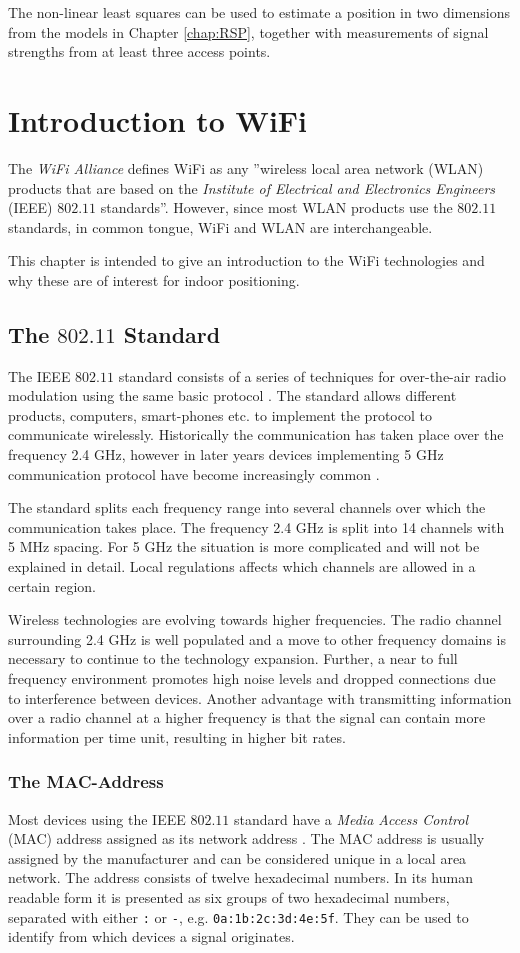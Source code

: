 \documentclass{LTHthesis}
\begin{document}
The non-linear least squares can be used to estimate a position in two dimensions from the models in Chapter \ref{chap:RSP}, together with measurements of signal
 strengths from at least three access points. 
%
\chapter{Introduction to WiFi} %
\label{chap:wifi}
The \emph{WiFi Alliance} defines WiFi as any ''wireless local area network (WLAN) products that are based on the \emph{Institute of Electrical and Electronics Engineers} (IEEE) $802.11$ standards''. However, since most WLAN products use the $802.11$ standards, in common tongue, WiFi and WLAN are interchangeable.    

This chapter is intended to give an introduction to the WiFi technologies and why these are of interest for indoor positioning.
%
\section{The $802.11$ Standard}
%
The IEEE $802.11$ standard consists of a series of techniques for over-the-air radio modulation using the same basic protocol \cite{IEEE:802.11}. The standard allows different products, computers, smart-phones etc. to implement the protocol to communicate wirelessly. Historically the communication has taken place over the frequency 2.4 GHz, however in later years devices implementing 5 GHz communication protocol have become increasingly common \cite{walrand10}.

The standard splits each frequency range into several channels over which the communication takes place. The frequency 2.4 GHz is split into 14 channels with 5 MHz spacing. For 5 GHz the situation is more complicated and will not be explained in detail. Local regulations affects which channels are allowed in a certain region.   

Wireless technologies are evolving towards higher frequencies. The radio channel  surrounding 2.4 GHz is well populated and a move to other frequency domains is necessary to continue to the technology expansion. Further, a near to full frequency environment promotes high noise levels and dropped connections due to interference between devices. Another advantage with transmitting information over a radio channel at a higher frequency is that the signal can contain more information per time unit, resulting in higher bit rates.    
%
\subsection{The MAC-Address}
%
Most devices using the IEEE $802.11$ standard have a \emph{Media Access Control} (MAC) address assigned as its network address \cite{IEEE:802.11}. The MAC address is usually assigned by the manufacturer and can be considered unique in a local area network. The address consists of twelve hexadecimal numbers. In its human readable form it is presented as six groups of two hexadecimal numbers, separated with either \verb|:| or \verb|-|, e.g. \verb|0a:1b:2c:3d:4e:5f|. They can be used to identify from which devices a signal originates.
%
\end{document}
